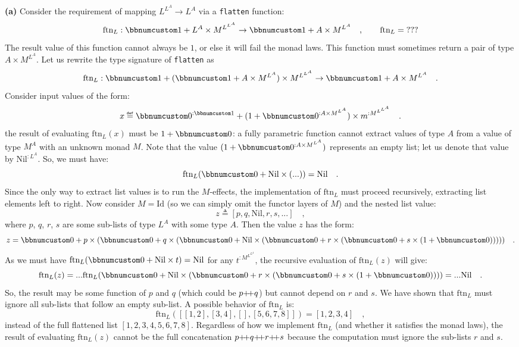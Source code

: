 \textbf{(a)} Consider the requirement of mapping $L^{L^{A}}\rightarrow L^{A}$
via a \lstinline!flatten! function:
\[
\text{ftn}_{L}:\bbnum 1+L^{A}\times M^{L^{L^{A}}}\rightarrow\bbnum 1+A\times M^{L^{A}}\quad,\quad\quad\text{ftn}_{L}=\text{???}
\]
The result value of this function cannot always be $1$, or else it
will fail the monad laws. This function must sometimes return a pair
of type $A\times M^{L^{A}}$. Let us rewrite the type signature of
\lstinline!flatten! as
\[
\text{ftn}_{L}:\bbnum 1+(\bbnum 1+A\times M^{L^{A}})\times M^{L^{L^{A}}}\rightarrow\bbnum 1+A\times M^{L^{A}}\quad.
\]
Consider input values of the form:
\[
x\triangleq\bbnum 0^{:\bbnum 1}+(1+\bbnum 0^{:A\times M^{L^{A}}})\times m^{:M^{L^{L^{A}}}}\quad.
\]
the result of evaluating $\text{ftn}_{L}(x)$ must be $1+\bbnum 0$:
a fully parametric function cannot extract values of type $A$ from
a value of type $M^{A}$ with an unknown monad $M$. Note that the
value $(1+\bbnum 0^{:A\times M^{L^{A}}})$ represents an empty list;
let us denote that value by $\text{Nil}^{:L^{A}}$. So, we must have:
\[
\text{ftn}_{L}(\bbnum 0+\text{Nil}\times(...))=\text{Nil}\quad.
\]
Since the only way to extract list values is to run the $M$-effects,
the implementation of $\text{ftn}_{L}$ must proceed recursively,
extracting list elements left to right. Now consider $M=\text{Id}$
(so we can simply omit the functor layers of $M$) and the nested
list value:
\[
z\triangleq\left[p,q,\text{Nil},r,s,...\right]\quad,
\]
 where $p$, $q$, $r$, $s$ are some sub-lists of type $L^{A}$
with some type $A$. Then the value $z$ has the form:
\[
z=\bbnum 0+p\times(\bbnum 0+q\times(\bbnum 0+\text{Nil}\times(\bbnum 0+r\times(\bbnum 0+s\times(1+\bbnum 0)))))\quad.
\]
As we must have $\text{ftn}_{L}(\bbnum 0+\text{Nil}\times t)=\text{Nil}$
for any $t^{:M^{L^{L^{A}}}}$, the recursive evaluation of $\text{ftn}_{L}(z)$
will give:
\[
\text{ftn}_{L}(z)=...\text{ftn}_{L}(\bbnum 0+\text{Nil}\times(\bbnum 0+r\times(\bbnum 0+s\times(1+\bbnum 0))))=...\text{Nil}\quad.
\]
So, the result may be some function of $p$ and $q$ (which could
be $p{\displaystyle }{+\negmedspace+} q$) but cannot depend on $r$ and $s$. We have shown
that $\text{ftn}_{L}$ must ignore all sub-lists that follow an empty
sub-list. A possible behavior of $\text{ftn}_{L}$ is:
\[
\text{ftn}_{L}(\left[\left[1,2\right],\left[3,4\right],\left[\right],\left[5,6,7,8\right]\right])=\left[1,2,3,4\right]\quad,
\]
instead of the full flattened list $\left[1,2,3,4,5,6,7,8\right]$.
Regardless of how we implement $\text{ftn}_{L}$ (and whether it satisfies
the monad laws), the result of evaluating $\text{ftn}_{L}(z)$ cannot
be the full concatenation $p{\displaystyle }{+\negmedspace+} q{\displaystyle }{+\negmedspace+} r{\displaystyle }{+\negmedspace+} s$ because the
computation must ignore the sub-lists $r$ and $s$.

